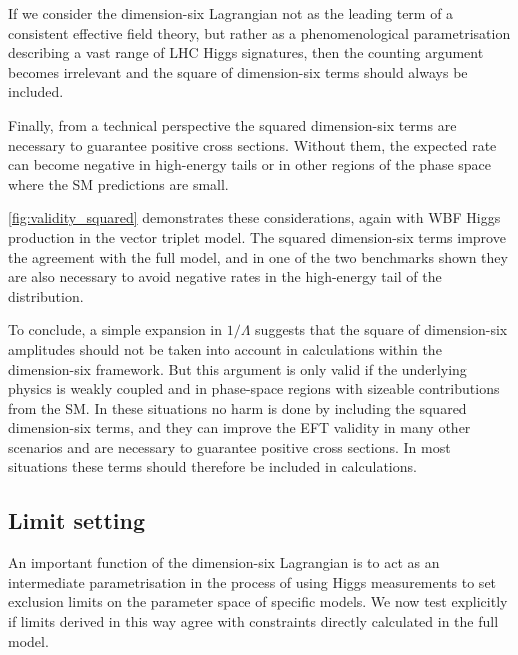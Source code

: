 If we consider the dimension-six Lagrangian not as the leading term of
a consistent effective field theory, but rather as a phenomenological
parametrisation describing a vast range of LHC Higgs signatures, then
the counting argument becomes irrelevant and the square of
dimension-six terms should always be included.

Finally, from a technical perspective the squared dimension-six terms
are necessary to guarantee positive cross sections. Without them, the
expected rate can become negative in high-energy tails or in other
regions of the phase space where the SM predictions are small. 

\autoref{fig:validity_squared} demonstrates these considerations,
again with WBF Higgs production in the vector triplet model. The
squared dimension-six terms improve the agreement with the full model,
and in one of the two benchmarks shown they are also necessary to
avoid negative rates in the high-energy tail of the distribution.

To conclude, a simple expansion in $1/\Lambda$ suggests that the
square of dimension-six amplitudes should not be taken into account in
calculations within the dimension-six framework. But this argument is
only valid if the underlying physics is weakly coupled and in
phase-space regions with sizeable contributions from the SM. In these
situations no harm is done by including the squared dimension-six
terms, and they can improve the EFT validity in many other scenarios
and are necessary to guarantee positive cross sections. In most
situations these terms should therefore be included in calculations.



\subsection{Limit setting}
\label{sec:validity_fits}

An important function of the dimension-six Lagrangian is to act as an
intermediate parametrisation in the process of using Higgs
measurements to set exclusion limits on the parameter space of
specific models. We now test explicitly if limits derived in this way agree
with constraints directly calculated in the full model.

